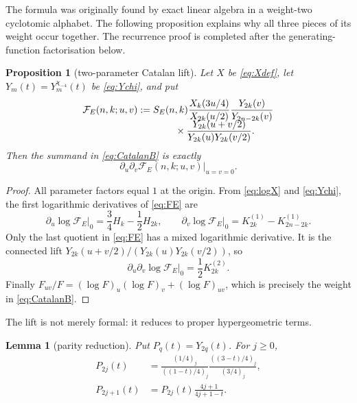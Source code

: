\documentclass[11pt]{article}
\newtheorem{lemma}[theorem]{Lemma}
\newtheorem{proposition}[theorem]{Proposition}
\theoremstyle{definition}
\theoremstyle{remark}
\begin{document}
The formula was originally found by exact linear algebra in a weight-two cyclotomic
alphabet.  The following proposition explains why all three pieces of its weight occur
together.  The recurrence proof is completed after the generating-function
factorisation below.

\begin{proposition}[two-parameter Catalan lift]\label{prop:Catalanlift}
Let $X$ be \eqref{eq:Xdef}, let $Y_m(t)=Y_m^{\chi_{-4}}(t)$ be \eqref{eq:Ychi}, and put
\begin{align}\label{eq:FE}
 \mathcal F_E(n,k;u,v):={}&S_E(n,k)
 \frac{X_k(3u/4)}{X_{2k}(u/2)}
 \frac{Y_{2k}(v)}{Y_{2n-2k}(v)}\\[-2mm]
 &\hspace{8mm}\times
 \frac{Y_{2k}(u+v/2)}{Y_{2k}(u)Y_{2k}(v/2)}.\notag
\end{align}
Then the summand in \eqref{eq:CatalanB} is exactly
\begin{equation}\label{eq:mixedFE}
 \left.\partial_u\partial_v\mathcal F_E(n,k;u,v)\right|_{u=v=0}.
\end{equation}
\end{proposition}

\begin{proof}
All parameter factors equal $1$ at the origin.  From \eqref{eq:logX} and
\eqref{eq:Ychi}, the first logarithmic derivatives of \eqref{eq:FE} are
\[
 \partial_u\log\mathcal F_E\big|_0=\frac34H_k-\frac12H_{2k},\qquad
 \partial_v\log\mathcal F_E\big|_0=K_{2k}^{(1)}-K_{2n-2k}^{(1)}.
\]
Only the last quotient in \eqref{eq:FE} has a mixed logarithmic derivative.  It is the
connected lift $Y_{2k}(u+v/2)/(Y_{2k}(u)Y_{2k}(v/2))$, so
\[
 \partial_u\partial_v\log\mathcal F_E\big|_0=\frac12K_{2k}^{(2)}.
\]
Finally $F_{uv}/F=(\log F)_u(\log F)_v+(\log F)_{uv}$, which is precisely the weight in
\eqref{eq:CatalanB}.
\end{proof}

The lift is not merely formal: it reduces to proper hypergeometric terms.

\begin{lemma}[parity reduction]\label{lem:parity}
Put $P_q(t)=Y_{2q}(t)$.  For $j\ge0$,
\begin{align}
 P_{2j}(t)
 &=\frac{(1/4)_j}{((1-t)/4)_j}
   \frac{((3-t)/4)_j}{(3/4)_j},\label{eq:P2j}\\
 P_{2j+1}(t)
 &=P_{2j}(t)\frac{4j+1}{4j+1-t}.\label{eq:P2j1}
\end{align}
\end{lemma}
\end{document}
